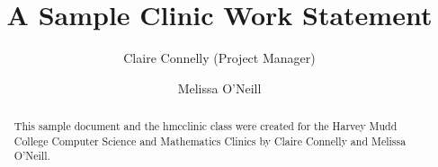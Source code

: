 \documentclass[proposal]{hmcclinic}
\title{A Sample Clinic Work Statement}
\author{Claire Connelly (Project Manager) \and Melissa O'Neill}
\begin{document}
\frontmatter


\maketitle




\begin{abstract}
  This sample document and the \textsf{hmcclinic} class were
  created for the Harvey Mudd College Computer Science and Mathematics
  Clinics by Claire Connelly and Melissa O'Neill.
\end{abstract}





\tableofcontents
\listoffigures
\listoftables




\mainmatter
\end{document}
